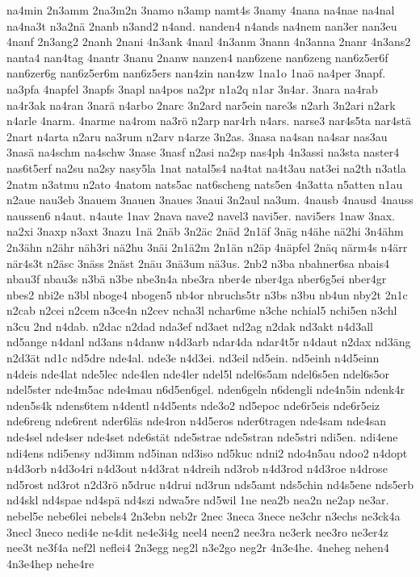 {na4min
2n3amm
2na3m2n
3namo
n3amp
namt4s
3namy
4nana
na4nae
na4nal
na4na3t
n3a2nä
2nanb
n3and2
n4and.
nanden4
n4ands
na4nem
nan3er
nan3eu
4nanf
2n3ang2
2nanh
2nani
4n3ank
4nanl
4n3anm
3nann
4n3anna
2nanr
4n3ans2
nanta4
nan4tag
4nantr
3nanu
2nanw
nanzen4
nan6zene
nan6zeng
nan6z5er6f
nan6zer6g
nan6z5er6m
nan6z5ers
nan4zin
nan4zw
1na1o
1naö
na4per
3napf.
na3pfa
4napfel
3napfs
3napl
na4pos
na2pr
n1a2q
n1ar
3n4ar.
3nara
na4rab
na4r3ak
na4ran
3narä
n4arbo
2narc
3n2ard
nar5ein
nare3s
n2arh
3n2ari
n2ark
n4arle
4narm.
4narme
na4rom
na3rö
n2arp
nar4rh
n4ars.
narse3
nar4s5ta
nar4stä
2nart
n4arta
n2aru
na3rum
n2arv
n4arze
3n2as.
3nasa
na4san
na4sar
nas3au
3nasä
na4schm
na4schw
3nase
3nasf
n2asi
na2sp
nas4ph
4n3assi
na3sta
naster4
nas6t5erf
na2su
na2sy
nasy5la
1nat
natal5s4
na4tat
na4t3au
nat3ei
na2th
n3atla
2natm
n3atmu
n2ato
4natom
nats5ac
nat6scheng
nats5en
4n3atta
n5atten
n1au
n2aue
nau3eb
3nauem
3nauen
3naues
3naui
3n2aul
na3um.
4nausb
4nausd
4nauss
naussen6
n4aut.
n4aute
1nav
2nava
nave2
navel3
navi5er.
navi5ers
1naw
3nax.
na2xi
3naxp
n3axt
3nazu
1nä
2näb
3n2äc
2näd
2n1äf
3näg
n4ähe
nä2hi
3n4ähm
2n3ähn
n2ähr
näh3ri
nä2hu
3näi
2n1ä2m
2n1än
n2äp
4näpfel
2näq
närm4s
n4ärr
när4s3t
n2äsc
3näss
2näst
2näu
3nä3um
nä3us.
2nb2
n3ba
nbahner6sa
nbais4
nbau3f
nbau3s
n3bä
n3be
nbe3n4a
nbe3ra
nber4e
nber4ga
nber6g5ei
nber4gr
nbes2
nbi2e
n3bl
nboge4
nbogen5
nb4or
nbruchs5tr
n3bs
n3bu
nb4un
nby2t
2n1c
n2cab
n2cei
n2cem
n3ce4n
n2cev
ncha3l
nchar6me
n3che
nchial5
nchi5en
n3chl
n3cu
2nd
n4dab.
n2dac
n2dad
nda3ef
nd3aet
nd2ag
n2dak
nd3akt
n4d3all
nd5ange
n4danl
nd3ans
n4danw
n4d3arb
ndar4da
ndar4t5r
n4daut
n2dax
nd3äng
n2d3ät
nd1c
nd5dre
nde4al.
nde3e
n4d3ei.
nd3eil
nd5ein.
nd5einh
n4d5einn
n4deis
nde4lat
nde5lec
nde4len
nde4ler
ndel5l
ndel6s5am
ndel6s5en
ndel6s5or
ndel5ster
nde4m5ac
nde4mau
n6d5en6gel.
nden6geln
n6dengli
nde4n5in
ndenk4r
nden5s4k
ndens6tem
n4dentl
n4d5ents
nde3o2
nd5epoc
nde6r5eis
nde6r5eiz
nde6reng
nde6rent
nder6läs
nde4ron
n4d5eros
nder6tragen
nde4sam
nde4san
nde4sel
nde4ser
nde4set
nde6stät
nde5strae
nde5stran
nde5stri
ndi5en.
ndi4ene
ndi4ens
ndi5ensy
nd3imm
nd5inan
nd3iso
nd5kuc
ndni2
ndo4n5au
ndoo2
n4dopt
n4d3orb
n4d3o4ri
n4d3out
n4d3rat
n4dreih
nd3rob
n4d3rod
n4d3roe
n4drose
nd5rost
nd3rot
n2d3rö
n5druc
n4drui
nd3run
nds5amt
nds5chin
nd4s5ene
nds5erb
nd4skl
nd4spae
nd4spä
nd4szi
ndwa5re
nd5wil
1ne
nea2b
nea2n
ne2ap
ne3ar.
nebel5e
nebe6lei
nebels4
2n3ebn
neb2r
2nec
3neca
3nece
ne3chr
n3echs
ne3ck4a
3necl
3neco
nedi4e
ne4dit
ne4e3i4g
neel4
neen2
nee3ra
ne3erk
nee3ro
ne3er4z
nee3t
ne3f4a
nef2l
neflei4
2n3egg
neg2l
n3e2go
neg2r
4n3e4he.
4neheg
nehen4
4n3e4hep
nehe4re
}
